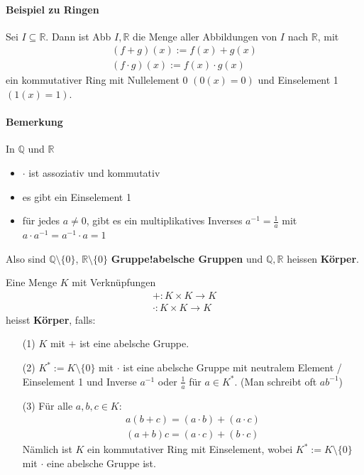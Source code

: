 \documentclass[11pt]{report}
\newcommand*\Zb[1] {\mathbb{#1}}
\newcommand*\f[1] {\textbf{#1}}
\begin{document}
\paragraph{Beispiel zu Ringen}
Sei $I \subseteq \Zb{R}$. Dann ist Abb $I, \Zb{R}$ die Menge aller Abbildungen von $I$ nach $\Zb{R}$, mit
\begin{align}
 (f+g)(x) := f(x) + g(x) \\
 (f\cdot g)(x) := f(x) \cdot g(x)
\end{align}
ein kommutativer Ring mit Nullelement 0 $(0(x)=0)$ und Einselement 1 $(1(x)=1)$.

\paragraph{Bemerkung}
In $\Zb{Q}$ und $\Zb{R}$
\begin{itemize}
 \item $\cdot$ ist assoziativ und kommutativ
 \item es gibt ein Einselement 1
 \item für jedes $a \neq 0$, gibt es ein multiplikatives Inverses $a^{-1} = \frac{1}{a}$ mit $a \cdot a^{-1} = a^{-1} \cdot a = 1$
\end{itemize}
Also sind $\Zb{Q}\setminus\{0\}$, $\Zb{R}\setminus\{0\}$ \f{Gruppe!abelsche Gruppen} und $\Zb{Q}, \Zb{R}$ heissen \f{Körper}.

Eine Menge $K$ mit Verknüpfungen
\begin{align}
 + : K \times K \rightarrow K\\
 \cdot : K \times K \rightarrow K
\end{align}
heisst \f{Körper}, falls:
\begin{itemize}
 \item[(1)] $K$ mit $+$ ist eine abelsche Gruppe.
 \item[(2)] $K^{*} := K\setminus\{0\}$ mit $\cdot$ ist eine abelsche Gruppe mit neutralem Element / Einselement 1 und Inverse $a^{-1}$ oder $\frac{1}{a}$ für $a \in K^{*}$. (Man schreibt oft $ab^{-1}$)
 \item[(3)] Für alle $a,b,c \in K$:
\begin{align}
 a(b + c) = (a\cdot b)+(a \cdot c) \\
 (a + b)c = (a \cdot c)+(b \cdot c)
\end{align}
Nämlich ist $K$ ein kommutativer Ring mit Einselement, wobei $K^{*} := K\setminus\{0\}$ mit $\cdot$ eine abelsche Gruppe ist.
\end{itemize}
\end{document}
